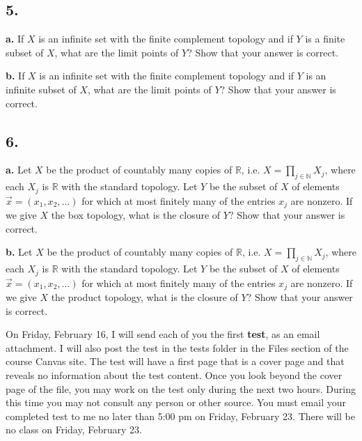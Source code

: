 \documentclass{amsart}
\theoremstyle{plain}
\theoremstyle{definition}
\theoremstyle{remark}
\begin{document}
\vspace{.15in}

\noindent
\subsection*{5.} 

{\bfseries a.} If $X$ is an infinite set with the finite complement topology and if $Y$ is a finite subset of $X$, what are the limit points of $Y$? Show that your answer is correct. 


\vspace{.1in}
{\bfseries b.} If $X$ is an infinite set with the finite complement topology and if $Y$ is an infinite subset of $X$, what are the limit points of $Y$? Show that your answer is correct. 




\vspace{.15in}

\noindent
\subsection*{6.} 

{\bfseries a.} Let $X$ be the product of countably many copies of $\mathbb R$, i.e. $X = \prod _{j\in \mathbb N } X_j$, where each $X_j$ is $\mathbb R$ with the standard topology. Let $Y$ be the subset of $X$ of elements $\vec{x} = ( x_1 , x_2 , . . . )$ for which at most finitely many of the entries $x_j$ are nonzero. If we give $X$ the box topology, what is the closure of $Y$? Show that your answer is correct. 

\vspace{.1in}

{\bfseries b.} Let $X$ be the product of countably many copies of $\mathbb R$, i.e. $X = \prod _{j\in \mathbb N } X_j$, where each $X_j$ is $\mathbb R$ with the standard topology. Let $Y$ be the subset of $X$ of elements $\vec{x} = ( x_1 , x_2 , . . . )$ for which at most finitely many of the entries $x_j$ are nonzero. If we give $X$ the product topology, what is the closure of $Y$? Show that your answer is correct. 

\vspace{.45in}
On Friday, February 16, I will send each of you the first {\bfseries test}, as an email attachment. I will also post the test in the tests folder in the Files section of the course Canvas site. The test will have a first page that is a cover page and that reveals no information about the test content.   Once you look beyond the cover page of the file, you may work on the test only during the next two hours.  During this time you may not consult any person or other source.  You must email your completed test to me 
no later than 5:00 pm on Friday, February 23.  There will be no class 
on Friday, February 23.  
\end{document}

